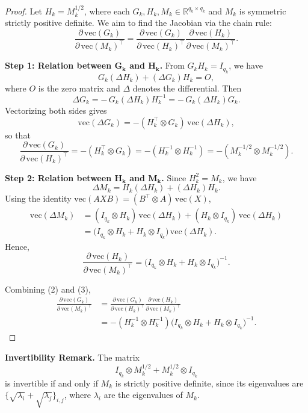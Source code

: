 \documentclass[10pt]{article}
\begin{document}
\begin{proof}
Let $H_k = M_k^{1/2}$,
where each $G_k, H_k, M_k \in \mathbb{R}^{q_k \times q_k}$ and $M_k$ is symmetric strictly positive definite.
We aim to find the Jacobian via the chain rule:
\[
\frac{\partial\,\mathrm{vec}(G_k)}{\partial\,\mathrm{vec}(M_k)^{\!\top}}
=
\frac{\partial\,\mathrm{vec}(G_k)}{\partial\,\mathrm{vec}(H_k)^{\!\top}}
\frac{\partial\,\mathrm{vec}(H_k)}{\partial\,\mathrm{vec}(M_k)^{\!\top}}.
\]

\noindent
{\bf Step 1: Relation between $\bm{G_k}$ and $\bm{H_k}$.}
From $G_k H_k = I_{q_k}$, we have
\[
G_k(\Delta H_k) + (\Delta G_k)H_k = O, 
\]
where $O$ is the zero matrix and $\Delta$ denotes the differential. Then
\[
\Delta G_k = -\,G_k (\Delta H_k) H_k^{-1} = -\,G_k (\Delta H_k) G_k.
\]
Vectorizing both sides gives
\[
\mathrm{vec}(\Delta G_k)
= - (H_k^\top \otimes G_k)\,\mathrm{vec}(\Delta H_k),
\]
so that
\[
\frac{\partial\,\mathrm{vec}(G_k)}{\partial\,\mathrm{vec}(H_k)^{\!\top}}
= - (H_k^\top \otimes G_k)
= - (H_k^{-1} \otimes H_k^{-1})
= - (M_k^{-1/2} \otimes M_k^{-1/2}).
\tag{2}
\]

\noindent
{\bf Step 2: Relation between $\bm{H_k}$ and $\bm{M_k}$.}
Since $H_k^2 = M_k$, we have
\[
\Delta M_k = H_k (\Delta H_k) + (\Delta H_k) H_k.
\]
Using the identity $\mathrm{vec}(A X B) = (B^\top \otimes A)\,\mathrm{vec}(X)$,
\begin{align*}
\mathrm{vec}(\Delta M_k)
&= (I_{q_k} \otimes H_k)\,\mathrm{vec}(\Delta H_k)
  + (H_k \otimes I_{q_k})\,\mathrm{vec}(\Delta H_k) \\[1mm]
&= \bigl(I_{q_k} \otimes H_k + H_k \otimes I_{q_k}\bigr)\,\mathrm{vec}(\Delta H_k).
\end{align*}
Hence,
\[
\frac{\partial\,\mathrm{vec}(H_k)}{\partial\,\mathrm{vec}(M_k)^{\!\top}}
= \bigl(I_{q_k} \otimes H_k + H_k \otimes I_{q_k}\bigr)^{-1}.
\tag{3}
\]


Combining (2) and (3),
\begin{align*}
\frac{\partial\,\mathrm{vec}(G_k)}{\partial\,\mathrm{vec}(M_k)^{\!\top}}
&=
\frac{\partial\,\mathrm{vec}(G_k)}{\partial\,\mathrm{vec}(H_k)^{\!\top}}
\frac{\partial\,\mathrm{vec}(H_k)}{\partial\,\mathrm{vec}(M_k)^{\!\top}} \\[1mm]
&=
- (H_k^{-1} \otimes H_k^{-1})
\bigl(I_{q_k} \otimes H_k + H_k \otimes I_{q_k}\bigr)^{-1}.
\end{align*}
\end{proof}

\noindent
{\bf Invertibility Remark.}
The matrix 
\[
I_{q_k} \otimes M_k^{1/2} + M_k^{1/2} \otimes I_{q_k}
\]
is invertible if and only if $M_k$ is strictly positive definite,
since its eigenvalues are $\{\sqrt{\lambda_i}+\sqrt{\lambda_j}\}_{i,j}$,
where $\lambda_i$ are the eigenvalues of $M_k$.
\end{document}
